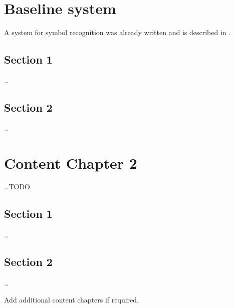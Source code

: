 
\chapter{Baseline system} %
\label{ch:Content1}

A system for symbol recognition was already written and is described in \cite{Kirsch}.


\section{Section 1}
\label{ch:Content1:sec:Section1}

\dots


\section{Section 2}
\label{ch:Content1:sec:Section2}

\dots



\chapter{Content Chapter 2}
\label{ch:Content2}

\dots TODO \cite{Blostein02}


\section{Section 1}
\label{ch:Content2:sec:Section1}

\dots


\section{Section 2}
\label{ch:Content2:sec:Section2}

\dots

Add additional content chapters if required. 